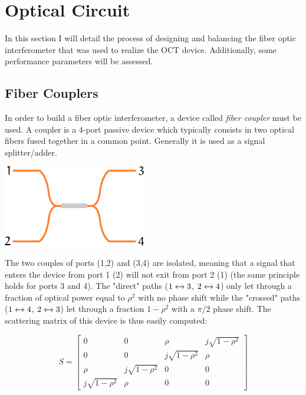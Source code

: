     
   
   
\newpage
\section{Optical Circuit}

In this section I will detail the process of designing and balancing the fiber optic interferometer that was used to realize the OCT device. Additionally, some performance parameters will be assessed. 


\subsection{Fiber Couplers}
In order to build a fiber optic interferometer, a device called \emph{fiber coupler} must be used. A coupler is a 4-port passive device which typically consists in two optical fibers fused together in a common point. Generally it is used as a signal splitter/adder.

\begin{center}
	{\includegraphics[width=0.35\linewidth]{gfx/ch3/couplers/fiber-coupler.pdf}}
\end{center}



The two couples of ports (1,2) and (3,4) are isolated, meaning that a signal that enters the device from port 1 (2) will not exit from port 2 (1) (the same principle holds for ports 3 and 4).  The "direct" paths ($1\xleftrightarrow{}3 $, $2\xleftrightarrow{} 4$) only let through a fraction of optical power equal to $\rho^2$ with no phase shift while the "crossed" paths ($1\xleftrightarrow{}4 $, $2\xleftrightarrow{} 3$) let through a fraction $1-\rho^2$ with a $\pi/2$ phase shift. The scattering matrix of this device is thus easily computed:

\begin{equation}
	S = \begin{bmatrix}
	0 & 0 & \rho & j\sqrt{1-\rho^2}\\
	0 & 0 & j\sqrt{1-\rho^2}& \rho \\
	\rho & j\sqrt{1-\rho^2}  & 0 & 0\\
	j\sqrt{1-\rho^2} & \rho  & 0 & 0
\end{bmatrix}
\end{equation}


